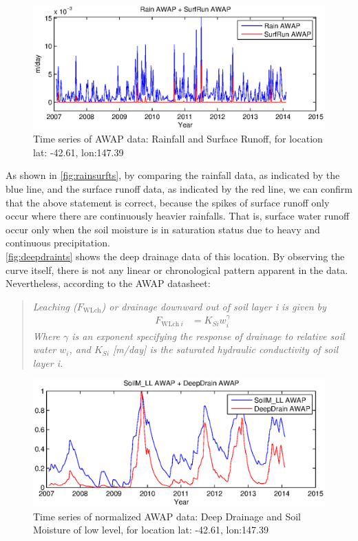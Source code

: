\begin{figure}[hbt] 
\begin{center}
\includegraphics[width=\linewidth]{gfx/rainsurfts.eps}
\end{center}
\caption{Time series of AWAP data: Rainfall and Surface Runoff, for location lat: -42.61, lon:147.39}
\label{fig:rainsurfts}
\end{figure}
As shown in \autoref{fig:rainsurfts}, by comparing the rainfall data, as indicated by the blue line, and the surface runoff data, as indicated by the red line, we can confirm that the above statement is correct, because the spikes of surface runoff only occur where there are continuously heavier rainfalls. That is, surface water runoff occur only when the soil moisture is in saturation status due to heavy and continuous precipitation.\\
\newline
\autoref{fig:deepdraints} shows the deep drainage data of this location. By observing the curve itself, there is not any linear or chronological pattern apparent in the data. Nevertheless, according to the AWAP datasheet:
\begin{quote}\begin{minipage}{0.9\textwidth}
\emph{Leaching ($F_{\text{WLch}}$) or drainage downward out of soil layer i is given by}
\begin{align}
F_{\text{WLch}~i} &= K_{Si}w_i^\gamma
\label{eq:awapleaching}
\end{align}
\emph{Where $\gamma$ is an exponent specifying the response of drainage to relative soil water $w_i$, and $K_{Si}$ [m/day] is the saturated hydraulic conductivity of soil layer i.}
\end{minipage}\end{quote}
\begin{figure}[hbt]
\begin{center}
\includegraphics[width=\linewidth]{gfx/soilmdeepts.eps}
\end{center}
\caption{Time series of normalized AWAP data: Deep Drainage and Soil Moisture of low level, for location lat: -42.61, lon:147.39}
\label{fig:soilmdeepts}
\end{figure}
